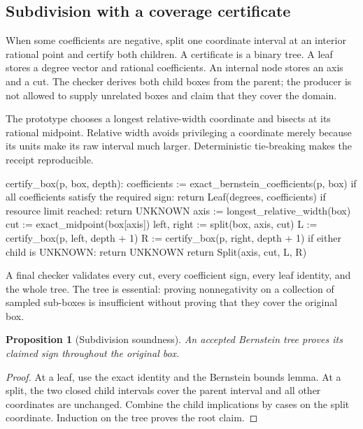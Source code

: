 \documentclass[11pt,letterpaper]{article}
\newtheorem{proposition}{Proposition}[section]
\theoremstyle{definition}
\theoremstyle{remark}
\begin{document}
\subsection{Subdivision with a coverage certificate}
When some coefficients are negative, split one coordinate interval at an interior rational point and certify both children. A certificate is a binary tree. A leaf stores a degree vector and rational coefficients. An internal node stores an axis and a cut. The checker derives both child boxes from the parent; the producer is not allowed to supply unrelated boxes and claim that they cover the domain.

The prototype chooses a longest relative-width coordinate and bisects at its rational midpoint. Relative width avoids privileging a coordinate merely because its units make its raw interval much larger. Deterministic tie-breaking makes the receipt reproducible.
\begin{code}
certify_box(p, box, depth):
  coefficients := exact_bernstein_coefficients(p, box)
  if all coefficients satisfy the required sign:
    return Leaf(degrees, coefficients)
  if resource limit reached: return UNKNOWN
  axis := longest_relative_width(box)
  cut := exact_midpoint(box[axis])
  left, right := split(box, axis, cut)
  L := certify_box(p, left, depth + 1)
  R := certify_box(p, right, depth + 1)
  if either child is UNKNOWN: return UNKNOWN
  return Split(axis, cut, L, R)
\end{code}
A final checker validates every cut, every coefficient sign, every leaf identity, and the whole tree. The tree is essential: proving nonnegativity on a collection of sampled sub-boxes is insufficient without proving that they cover the original box.

\begin{proposition}[Subdivision soundness]
An accepted Bernstein tree proves its claimed sign throughout the original box.
\end{proposition}
\begin{proof}
At a leaf, use the exact identity and the Bernstein bounds lemma. At a split, the two closed child intervals cover the parent interval and all other coordinates are unchanged. Combine the child implications by cases on the split coordinate. Induction on the tree proves the root claim.
\end{proof}
\end{document}
